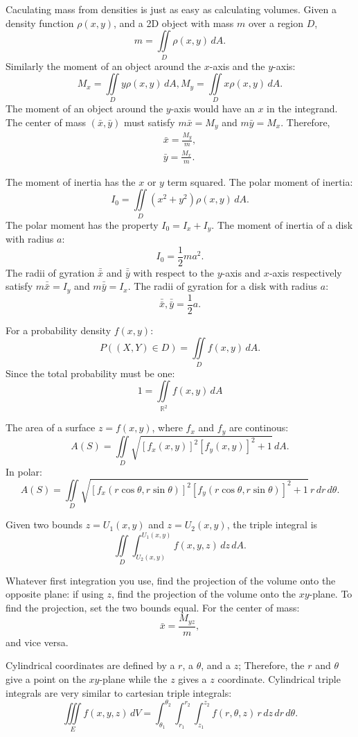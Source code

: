 \documentclass{article}
\begin{document}
Caculating mass from densities is just as easy as calculating volumes.
Given a density function $\rho (x,y)$, and a 2D object with mass $m$
over a region $D$,
\[
m = \iint \limits_D \rho(x,y) \, dA.
\]
Similarly the moment of an object around the $x$-axis and the $y$-axis:
\[
M_x = \iint \limits_D y \rho(x,y) \, dA,
M_y = \iint \limits_D x \rho(x,y) \, dA.
 \]
The moment of an object around the $y$-axis would have an $x$ in the integrand.
The center of mass $(\bar{x}, \bar{y})$ must satisfy $m\bar{x} = M_y$ and
$m\bar{y} = M_x$. Therefore, 
\begin{align}
    \bar{x} = \frac{M_y}{m},\nonumber \\ 
    \bar{y} = \frac{M_x}{m}. \nonumber
\end{align}

The moment of inertia has the $x$ or $y$ term squared. The polar moment
of inertia:
\[
I_0 = \iint \limits_D (x^2 + y^2) \rho(x,y) \, dA.
\]
The polar moment has the property $I_0 = I_x + I_y$. The moment of 
inertia of a disk with radius $a$:
\[
I_0 = \frac{1}{2}ma^2.
\]
The radii of gyration $\bar{\bar{x}}$ and $\bar{\bar{y}}$ with respect to
the $y$-axis and $x$-axis respectively satisfy $m\bar{\bar{x}}=I_y$ and 
$m\bar{\bar{y}}=I_x$. The radii of gyration for a disk with radius $a$:
\[
    \bar{\bar{x}}, \bar{\bar{y}} = \frac{1}{2}a.
\]

For a probability density $f(x,y)$:
\[
P((X,Y) \in D) = \iint \limits_D f(x,y) \, dA.
\]
Since the total probability must be one:
\[
1 = \iint \limits_{\mathbb{R}^2} f(x,y) \, dA
\]
 
The area of a surface $z=f(x,y)$, where $f_x$ and $f_y$ are continous:
\[
A(S) = \iint \limits_D \sqrt{[f_x(x,y)]^2 [f_y(x,y)]^2+1} \, dA.
\]
In polar:
\[
A(S) = \iint  \limits_D \sqrt{[f_x(r\cos\theta,r\sin\theta)]^2 [f_y(r\cos\theta,r\sin\theta)]^2+1} \, r\,dr \,d\theta.
\]

Given two bounds $z = U_1(x,y)$ and $z = U_2(x,y)$, the triple integral is
\[
\iint \limits_D \int_{U_2(x,y)}^{U_1(x,y)} f(x,y,z) \, dz \, dA.
\]

Whatever first integration you use, find the projection of the volume onto the opposite plane:
if using $z$, find the projection of the volume onto the $xy$-plane. To find
the projection, set the two bounds equal. For the center of mass:
\[
\bar{x} = \frac{M_{yz}}{m},
\] 
and vice versa.

Cylindrical coordinates are defined by a $r$, a $\theta$, and a $z$; Therefore, the $r$
and $\theta$ give a point on the $xy$-plane while the $z$ gives a $z$ coordinate.
Cylindrical triple integrals are very similar to cartesian triple integrals:
\[
    \iiint \limits_E f(x,y,z) \, dV = \int_{\theta_1}^{\theta_2} \int_{r_1}^{r_2} \int_{z_1}^{z_2} f(r,\theta,z) \, r \, dz \, dr \, d\theta.
\]
\end{document}
